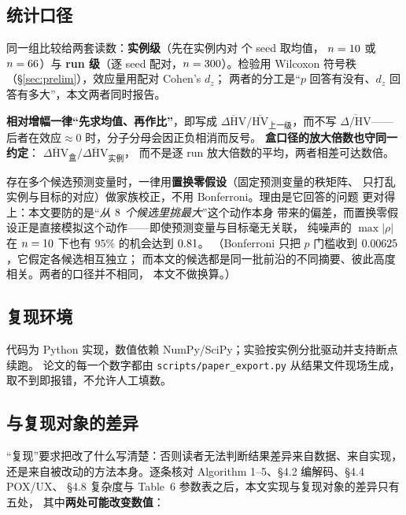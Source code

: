 \documentclass[UTF8, a4paper, 11pt]{ctexart}
\newcommand{\hv}{\mathrm{HV}}
\begin{document}
\subsection{统计口径}\label{sec:stat}
同一组比较给两套读数：\textbf{实例级}（先在实例内对 \SetSeeds 个 seed 取均值，
$n=10$ 或 $n=66$）与 \textbf{run 级}（逐 seed 配对，$n=300$）。检验用
Wilcoxon 符号秩（\S\ref{sec:prelim}），效应量用配对 Cohen's $d_z$；
两者的分工是“$p$ 回答有没有、$d_z$ 回答有多大”，本文两者同时报告。

\textbf{相对增幅一律“先求均值、再作比”}，即写成
$\overline{\Delta \hv}/\overline{\hv}_{\text{上一级}}$，而不写
$\overline{\Delta/\hv}$——后者在效应$\approx 0$ 时，分子分母会因正负相消而反号。
\textbf{盒口径的放大倍数也守同一约定}：
$\overline{\Delta \hv}_{\text{盒}}/\overline{\Delta \hv}_{\text{实例}}$，
而不是逐 run 放大倍数的平均，两者相差可达数倍。

存在多个候选预测变量时，一律用\textbf{置换零假设}（固定预测变量的秩矩阵、
只打乱实例与目标的对应）做家族校正，不用 Bonferroni。理由是它回答的问题
更对得上：本文要防的是“\emph{从 $8$ 个候选里挑最大}”这个动作本身
带来的偏差，而置换零假设正是直接模拟这个动作——即使预测变量与目标毫无关联，
纯噪声的 $\max|\rho|$ 在 $n=10$ 下也有 $95\%$ 的机会达到 $0.81$。
（Bonferroni 只把 $p$ 门槛收到 $0.00625$，它假定各候选相互独立；
而本文的候选都是同一批前沿的不同摘要、彼此高度相关。两者的口径并不相同，
本文不做换算。）

\subsection{复现环境}
代码为 Python 实现，数值依赖 NumPy/SciPy；实验按实例分批驱动并支持断点续跑。
论文的每一个数字都由 \texttt{scripts/paper\_export.py} 从结果文件现场生成，
取不到即报错，不允许人工填数。

\subsection{与复现对象的差异}\label{sec:deviation}
“复现”要求把改了什么写清楚：否则读者无法判断结果差异来自数据、来自实现，
还是来自被改动的方法本身。逐条核对 Algorithm 1--5、\S4.2 编解码、\S4.4 POX/UX、
\S4.8 复杂度与 Table~6 参数表之后，本文实现与复现对象的差异只有五处，
其中\textbf{两处可能改变数值}：
\end{document}
